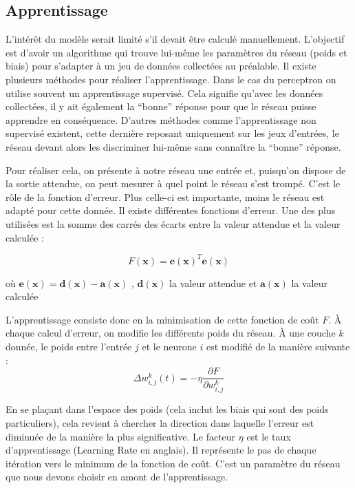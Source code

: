 \subsection{Apprentissage}

L'intérêt du modèle serait limité s'il devait être calculé manuellement. L'objectif est d'avoir un algorithme qui trouve lui-même les paramètres du réseau
(poids et biais) pour s'adapter à un jeu de données collectées au préalable. Il existe plusieurs méthodes pour réaliser l'apprentissage. Dans le cas du 
perceptron on utilise souvent un apprentissage supervisé. Cela signifie qu'avec les données collectées, il y ait également la ``bonne'' réponse pour que 
le réseau puisse apprendre en conséquence. D'autres méthodes comme l'apprentissage non supervisé existent, cette dernière reposant uniquement sur les jeux 
d'entrées, le réseau devant alors les discriminer lui-même sans connaître la ``bonne'' réponse.

Pour réaliser cela, on présente à notre réseau une entrée et, puisqu'on dispose de la sortie attendue, on peut mesurer à quel point le réseau s'est trompé.
C'est le rôle de la fonction d'erreur. Plus celle-ci est importante, moins le réseau est adapté pour cette donnée. Il existe différentes fonctions
d'erreur. Une des plus utilisées est la somme des carrés des écarts entre la valeur attendue et la valeur calculée : 

\begin{equation}
\displaystyle F(\mathbf{x}) = \mathbf{e(x)}^T\mathbf{e(x)} 
\end{equation}

où $\displaystyle \mathbf{e(x)} = \mathbf{d(x)} - \mathbf{a(x)} $ ,
$\mathbf{d(x)}$ la valeur attendue et $\mathbf{a(x)}$ la valeur calculée


L'apprentissage consiste donc en la minimisation de cette fonction de coût $F$. À chaque calcul d'erreur, on modifie les différents poids du réseau.
À une couche $k$ donnée, le poids entre l'entrée $j$ et le neurone $i$ est modifié de la manière suivante : 
\begin{equation}
 \Delta w^k_{i,j}(t) = - \eta \frac{\partial F}{\partial w^k_{i,j}}
\end{equation}
 
En se plaçant dans l'espace des poids (cela inclut les biais qui sont des poids particuliers), cela revient à chercher la direction dans laquelle l'erreur
est diminuée de la manière la plus significative. Le facteur $\eta$ est le taux d'apprentissage (Learning Rate en anglais). Il représente le pas de
chaque itération vers le minimum de la fonction de coût. C'est un paramètre du réseau que nous devons choisir en amont de l'apprentissage.


